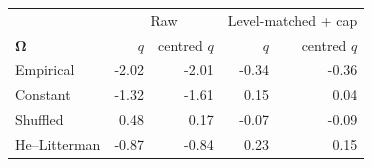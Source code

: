 \begin{tabular}{lrrrr}
\toprule
 & \multicolumn{2}{c}{Raw} & \multicolumn{2}{c}{Level-matched + cap} \\
$\bm{\Omega}$ & $q$ & centred $q$ & $q$ & centred $q$ \\
\midrule
Empirical & -2.02 & -2.01 & -0.34 & -0.36 \\
Constant & -1.32 & -1.61 & 0.15 & 0.04 \\
Shuffled & 0.48 & 0.17 & -0.07 & -0.09 \\
He--Litterman & -0.87 & -0.84 & 0.23 & 0.15 \\
\bottomrule
\end{tabular}

